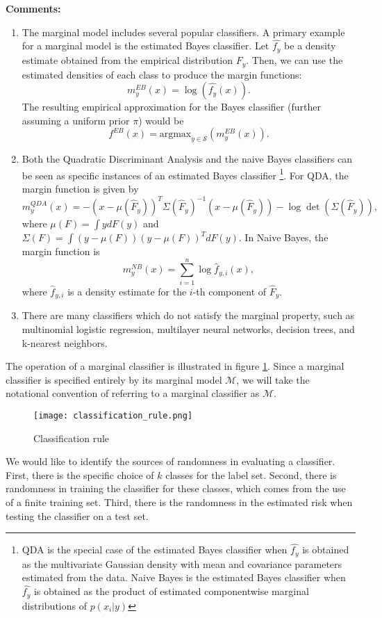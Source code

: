 \documentclass[12pt]{article}
\begin{document}
\textbf{Comments:}
\begin{enumerate}
\item The marginal model includes several popular classifiers.
A primary example for a marginal model is the estimated Bayes
classifier. Let $\hat{f_y}$ be a density estimate obtained from the
empirical distribution $\hat{F_y}$. Then, we can use the estimated
densities of each class to produce the margin functions:
\[ m^{EB}_y(x) = \log(\hat{f_{y}}(x)).\]
The resulting empirical approximation for the Bayes classifier
(further assuming a uniform prior $\pi$) would be
\[ f^{EB}(x) = \text{argmax}_{y \in \mathcal{S}}(m^{EB}_y(x)).\]
\item Both the Quadratic Discriminant Analysis and the naive Bayes classifiers can be seen as specific instances of an estimated Bayes classifier
\footnote{QDA is the special case of the estimated Bayes classifier when $\hat{f_y}$ is obtained as
the multivariate Gaussian density with mean and covariance parameters estimated from the data.
Naive Bayes is the estimated Bayes classifier when $\hat{f_y}$ is obtained as the product of estimated componentwise marginal distributions
of $p(x_i|y)$}. 
For QDA, the margin function is
given by
\[
m_y^{QDA}(x) = -(x - \mu(\hat{F}_y))^T \Sigma(\hat{F}_y)^{-1} (x-\mu(\hat{F}_y)) - \log\det(\Sigma(\hat{F}_y)),
\]
where $\mu(F) = \int y dF(y)$ and $\Sigma(F) = \int (y-\mu(F))(y-\mu(F))^T dF(y)$.
In Naive Bayes, the margin function is
\[
m^{NB}_y(x) = \sum_{i=1}^n \log \hat{f}_{y, i}(x),
\]
where $\hat{f}_{y, i}$ is a density estimate for the $i$-th component of
$\hat{F}_y$.
\item There are many classifiers which do not satisfy the marginal property, such as multinomial logistic regression,
multilayer neural networks, decision trees, and k-nearest neighbors.
\end{enumerate}

The operation of a marginal classifier is illustrated in figure
\ref{fig:classification_rule}.  Since a marginal classifier is
specified entirely by its marginal model $\mathcal{M}$, we will take
the notational convention of referring to a marginal classifier as
$\mathcal{M}$.

\begin{figure}[h]
\centering
\texttt{[image: classification\_rule.png]}
\caption{Classification rule}\label{fig:classification_rule}
\end{figure}

We would like to identify the sources of randomness in evaluating a
classifier.  First, there is the specific choice of $k$ classes for
the label set.   Second, there is randomness in training the classifier
for these classes, which comes from the use of a finite training
set. Third, there is the randomness in the estimated risk when
testing the classifier on a test set.
\end{document}
